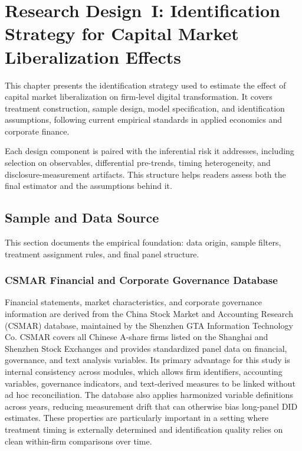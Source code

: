 \chapter{Research Design~I: Identification Strategy for Capital Market Liberalization Effects}
\label{chap:research_design_1}

This chapter presents the identification strategy used to estimate the effect of capital market liberalization on firm-level digital transformation. It covers treatment construction, sample design, model specification, and identification assumptions, following current empirical standards in applied economics and corporate finance.

Each design component is paired with the inferential risk it addresses, including selection on observables, differential pre-trends, timing heterogeneity, and disclosure-measurement artifacts. This structure helps readers assess both the final estimator and the assumptions behind it.

\section{Sample and Data Source}

This section documents the empirical foundation: data origin, sample filters, treatment assignment rules, and final panel structure.

\subsection{CSMAR Financial and Corporate Governance Database}

Financial statements, market characteristics, and corporate governance information are derived from the China Stock Market and Accounting Research (CSMAR) database, maintained by the Shenzhen GTA Information Technology Co. CSMAR covers all Chinese A-share firms listed on the Shanghai and Shenzhen Stock Exchanges and provides standardized panel data on financial, governance, and text analysis variables. Its primary advantage for this study is internal consistency across modules, which allows firm identifiers, accounting variables, governance indicators, and text-derived measures to be linked without ad hoc reconciliation. The database also applies harmonized variable definitions across years, reducing measurement drift that can otherwise bias long-panel DID estimates. These properties are particularly important in a setting where treatment timing is externally determined and identification quality relies on clean within-firm comparisons over time.

